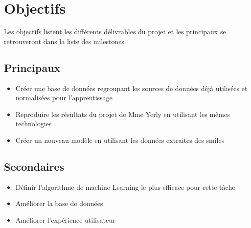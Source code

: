 \chapter{Objectifs}
\label{chap:objectifs}

Les objectifs listent les différents délivrables du projet et les principaux se retrouveront dans la liste des milestones.

\section{Principaux}
\begin{itemize}
   \item Créer une base de données regroupant les sources de données déjà utilisées et normalisées pour l'apprentissage
   \item Reproduire les résultats du projet de Mme Yerly en utilisant les mêmes technologies
   \item Créer un nouveau modèle en utilisant les données extraites des \acrshort{smiles}
\end{itemize}
\section{Secondaires}
\begin{itemize}
   \item Définir l'algorithme de machine Learning le plus efficace pour cette tâche
   \item Améliorer la base de données
   \item Améliorer l'expérience utilisateur
\end{itemize}
